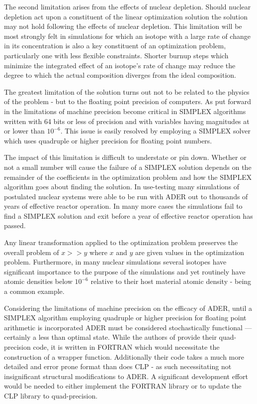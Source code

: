 The second limitation arises from the effects of nuclear depletion. Should
nuclear depletion act upon a constituent of the linear optimization solution
the solution may not hold following the effects of nuclear depletion. This
limitation will be most strongly felt in simulations for which an isotope
with a large rate of change in its concentration is also a key constituent of
an optimization problem, particularly one with less flexible constraints. 
Shorter
burnup steps which minimize the integrated effect of an isotope's rate of change
may reduce the degree to which the actual composition diverges from the ideal
composition.

The greatest limitation of the solution turns out not to be related to the
physics of the problem - but to the floating point precision of computers. 
As put forward in 
\cite{STANFORD} the limitations of machine precision become critical in
SIMPLEX algorithms written with 64 bits or less of precision and with
variables having magnitudes at or lower than $10^{-6}$. This issue is easily
resolved by employing a SIMPLEX solver which uses quadruple or higher precision
for floating point numbers. 

The impact of this limitation is difficult to understate or pin down. Whether or
not a small number will cause the failure of a SIMPLEX solution depends on the
remainder of the coefficients in the optimization problem and how the SIMPLEX
algorithm goes about finding the solution. In use-testing many simulations of
postulated nuclear systems were able to be run with ADER out to thousands of
years of effective reactor operation. In many more cases the simulations fail
to find a SIMPLEX solution and exit before a year of effective reactor
operation has passed.

Any linear transformation applied to the optimization problem preserves the
overall problem of $x >> y$ where $x$ and $y$ are given values in the
optimization problem. Furthermore, in many nuclear simulations several isotopes
have significant importance to the purpose of the simulations and yet routinely
have atomic densities below $10^{-6}$ relative to their host material atomic
density -  being a common example.

Considering the limitations of machine precision on the efficacy of ADER, until
a SIMPLEX algorithm employing quadruple or higher precision for floating point
arithmetic is incorporated ADER must be considered stochastically functional
--- certainly a less than optimal state. While the authors of \cite{STANFORD}
provide their quad-precision code, it is written in FORTRAN which would 
necessitate the construction of a wrapper function. Additionally their code 
takes a much more detailed and error prone format than does CLP - as such 
necessitating  not insignificant structural modifications to ADER. A significant
development effort would be needed to either implement the FORTRAN library or
to update the CLP library to quad-precision.


